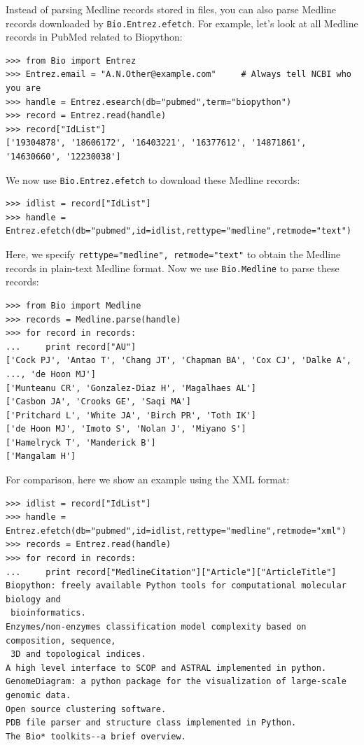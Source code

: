 \documentclass{report}
\begin{document}
Instead of parsing Medline records stored in files, you can also parse Medline records downloaded by \verb+Bio.Entrez.efetch+. For example, let's look at all Medline records in PubMed related to Biopython:
\begin{verbatim}
>>> from Bio import Entrez
>>> Entrez.email = "A.N.Other@example.com"     # Always tell NCBI who you are
>>> handle = Entrez.esearch(db="pubmed",term="biopython")
>>> record = Entrez.read(handle)
>>> record["IdList"]
['19304878', '18606172', '16403221', '16377612', '14871861', '14630660', '12230038']
\end{verbatim}
We now use \verb+Bio.Entrez.efetch+ to download these Medline records:
\begin{verbatim}
>>> idlist = record["IdList"]
>>> handle = Entrez.efetch(db="pubmed",id=idlist,rettype="medline",retmode="text")
\end{verbatim}
Here, we specify \verb+rettype="medline", retmode="text"+ to obtain the Medline records in plain-text Medline format. Now we use \verb+Bio.Medline+ to parse these records:
\begin{verbatim}
>>> from Bio import Medline
>>> records = Medline.parse(handle)
>>> for record in records:
...     print record["AU"]
['Cock PJ', 'Antao T', 'Chang JT', 'Chapman BA', 'Cox CJ', 'Dalke A', ..., 'de Hoon MJ']
['Munteanu CR', 'Gonzalez-Diaz H', 'Magalhaes AL']
['Casbon JA', 'Crooks GE', 'Saqi MA']
['Pritchard L', 'White JA', 'Birch PR', 'Toth IK']
['de Hoon MJ', 'Imoto S', 'Nolan J', 'Miyano S']
['Hamelryck T', 'Manderick B']
['Mangalam H']
\end{verbatim}

For comparison, here we show an example using the XML format:
\begin{verbatim}
>>> idlist = record["IdList"]
>>> handle = Entrez.efetch(db="pubmed",id=idlist,rettype="medline",retmode="xml")
>>> records = Entrez.read(handle)
>>> for record in records:
...     print record["MedlineCitation"]["Article"]["ArticleTitle"]
Biopython: freely available Python tools for computational molecular biology and
 bioinformatics.
Enzymes/non-enzymes classification model complexity based on composition, sequence,
 3D and topological indices.
A high level interface to SCOP and ASTRAL implemented in python.
GenomeDiagram: a python package for the visualization of large-scale genomic data.
Open source clustering software.
PDB file parser and structure class implemented in Python.
The Bio* toolkits--a brief overview.
\end{verbatim}
\end{document}
